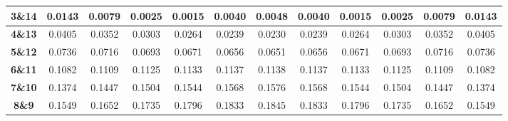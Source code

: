 \documentclass[conference]{IEEEtran}
\begin{document}
\begin{table*}[ht]
\begin{center}
{\begin{tabular}{|l|l|l|l|l|l|l|l|l|l|l|l|}
\hline
\multicolumn{1}{|c|}{\textbf{3\&14}} & \multicolumn{1}{c|}{0.0143} & \multicolumn{1}{c|}{0.0079} & \multicolumn{1}{c|}{0.0025} & \multicolumn{1}{c|}{0.0015} & \multicolumn{1}{c|}{0.0040} & \multicolumn{1}{c|}{0.0048} & \multicolumn{1}{c|}{0.0040} & \multicolumn{1}{c|}{0.0015} & \multicolumn{1}{c|}{0.0025} & \multicolumn{1}{c|}{0.0079} & \multicolumn{1}{c|}{0.0143} \\ 
\hline
\multicolumn{1}{|c|}{\textbf{4\&13}} & \multicolumn{1}{c|}{0.0405} & \multicolumn{1}{c|}{0.0352} & \multicolumn{1}{c|}{0.0303} & \multicolumn{1}{c|}{0.0264} & \multicolumn{1}{c|}{0.0239} & \multicolumn{1}{c|}{0.0230} & \multicolumn{1}{c|}{0.0239} & \multicolumn{1}{c|}{0.0264} & \multicolumn{1}{c|}{0.0303} & \multicolumn{1}{c|}{0.0352} & \multicolumn{1}{c|}{0.0405} \\ 
\hline
\multicolumn{1}{|c|}{\textbf{5\&12}} & \multicolumn{1}{c|}{0.0736} & \multicolumn{1}{c|}{0.0716} & \multicolumn{1}{c|}{0.0693} & \multicolumn{1}{c|}{0.0671} & \multicolumn{1}{c|}{0.0656} & \multicolumn{1}{c|}{0.0651} & \multicolumn{1}{c|}{0.0656} & \multicolumn{1}{c|}{0.0671} & \multicolumn{1}{c|}{0.0693} & \multicolumn{1}{c|}{0.0716} & \multicolumn{1}{c|}{0.0736} \\ 
\hline
\multicolumn{1}{|c|}{\textbf{6\&11}} & \multicolumn{1}{c|}{0.1082} & \multicolumn{1}{c|}{0.1109} & \multicolumn{1}{c|}{0.1125} & \multicolumn{1}{c|}{0.1133} & \multicolumn{1}{c|}{0.1137} & \multicolumn{1}{c|}{0.1138} & \multicolumn{1}{c|}{0.1137} & \multicolumn{1}{c|}{0.1133} & \multicolumn{1}{c|}{0.1125} & \multicolumn{1}{c|}{0.1109} & \multicolumn{1}{c|}{0.1082} \\ 
\hline
\multicolumn{1}{|c|}{\textbf{7\&10}} & \multicolumn{1}{c|}{0.1374} & \multicolumn{1}{c|}{0.1447} & \multicolumn{1}{c|}{0.1504} & \multicolumn{1}{c|}{0.1544} & \multicolumn{1}{c|}{0.1568} & \multicolumn{1}{c|}{0.1576} & \multicolumn{1}{c|}{0.1568} & \multicolumn{1}{c|}{0.1544} & \multicolumn{1}{c|}{0.1504} & \multicolumn{1}{c|}{0.1447} & \multicolumn{1}{c|}{0.1374} \\ 
\hline
\multicolumn{1}{|c|}{\textbf{8\&9}} & \multicolumn{1}{c|}{0.1549} & \multicolumn{1}{c|}{0.1652} & \multicolumn{1}{c|}{0.1735} & \multicolumn{1}{c|}{0.1796} & \multicolumn{1}{c|}{0.1833} & \multicolumn{1}{c|}{0.1845} & \multicolumn{1}{c|}{0.1833} & \multicolumn{1}{c|}{0.1796} & \multicolumn{1}{c|}{0.1735} & \multicolumn{1}{c|}{0.1652} & \multicolumn{1}{c|}{0.1549} \\ 
\hline
\end{tabular}

}
\label{tab1}
\end{center}
\end{table*}
\end{document}
